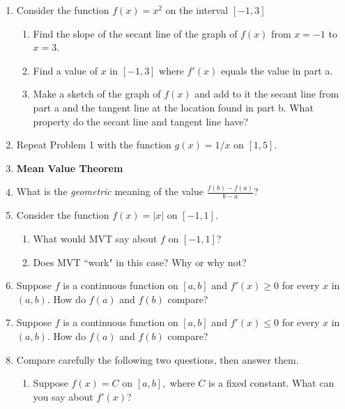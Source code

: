 \documentclass[11pt,fleqn]{article}
\begin{document}
\setlength{\parindent}{0cm}
\renewcommand{\headrulewidth}{0pt}
\newcommand{\blank}[1]{\rule{#1}{0.75pt}}
\renewcommand{\d}{\displaystyle}
\vspace*{-0.7in}
\begin{center}
 {\large{ }}
\end{center}

\begin{enumerate}
\item Consider the function $f(x)=x^2$ on the interval $[-1,3]$
	\begin{enumerate}
	\item Find the slope of the secant line of the graph
of $f(x)$ from $x=-1$ to $x=3$.
\vfill
	\item Find a value of $x$ in $[-1,3]$ where $f'(x)$
equals the value in part a.
\vfill
	\item Make a sketch of the graph of $f(x)$ and add to it
the secant line from part a and the tangent line at the location
found in part b.  What property do the secant line and tangent line have?
\vfill
	\end{enumerate}
\item Repeat Problem 1 with the function $g(x) = 1/x$ on $[1,5].$
\vspace{2.5in}
\newpage
\item \textbf{Mean Value Theorem}
\vspace{2.5in}
\item What is the \emph{geometric} meaning of the value $\frac{f(b)-f(a)}{b-a}$?
\vskip 1in
\item Consider the function $f(x)=|x|$ on $[-1,1].$ 
	\begin{enumerate}
	\item What would MVT say about $f$ on $[-1,1]$?
	\vfill
	\item Does MVT ``work" in this case? Why or why not?
	\vfill
	\end{enumerate}
\newpage
\item Suppose $f$ is a continuous function on $[a,b]$ and $f'(x)\ge 0$
for every $x$ in $(a,b)$.  How do $f(a)$ and $f(b)$ compare?
\vfill
\item Suppose $f$ is a continuous function on $[a,b]$ and $f'(x)\le 0$
for every $x$ in $(a,b)$.  How do $f(a)$ and $f(b)$ compare?
\vfill
\item Compare carefully the following two questions, then answer them.
	\begin{enumerate}
	\item Suppose $f(x)=C$ on $[a,b],$ where $C$ is a fixed constant. What can you say about $f'(x)$?

\end{enumerate}
\end{enumerate}
\end{document}
